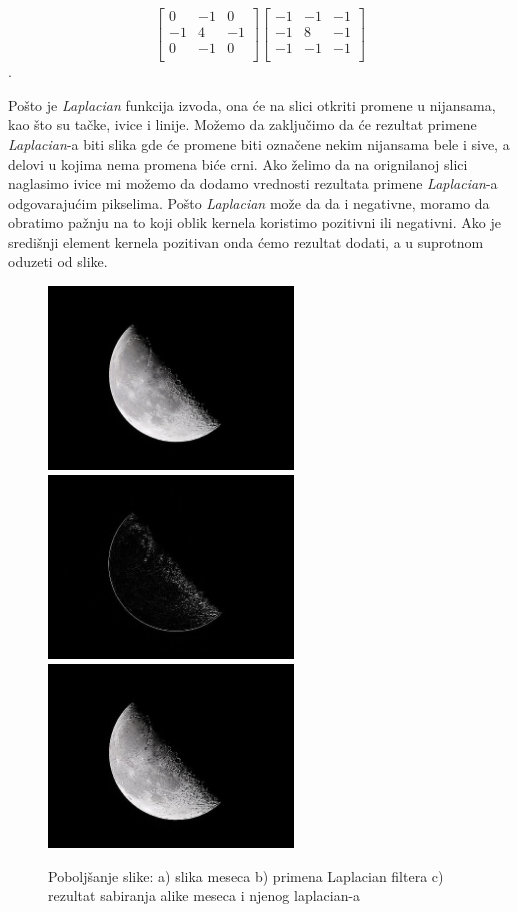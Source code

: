 \documentclass[a4paper,12pt,titlepage]{article}
\begin{document}
\[
\begin{bmatrix}
     0 & -1 & 0 \\
     -1 & 4 & -1 \\
     0 & -1 & 0 \\
\end{bmatrix}
\begin{bmatrix}
     -1 & -1 & -1 \\
     -1 & 8 & -1 \\
     -1 & -1 & -1 \\
\end{bmatrix}
\]. 

Pošto je \emph{Laplacian} funkcija izvoda, ona će na slici otkriti promene u nijansama, kao što su tačke, ivice i linije. Možemo da zaključimo da će rezultat primene \emph{Laplacian}-a biti slika gde će promene biti označene nekim nijansama bele i sive, a delovi u kojima nema promena biće crni. Ako želimo da na orignilanoj slici naglasimo ivice mi možemo da dodamo vrednosti rezultata primene \emph{Laplacian}-a odgovarajućim pikselima. Pošto \emph{Laplacian} može da da i negativne, moramo da obratimo pažnju na to koji oblik kernela koristimo pozitivni ili negativni. Ako je središnji element kernela pozitivan onda ćemo rezultat dodati, a u suprotnom oduzeti od slike.

\begin{figure}[ht!]
\centering
\includegraphics[width=65mm]{img/moon.jpg}
\includegraphics[width=65mm]{img/moonLap.jpg}
\includegraphics[width=65mm]{img/moonEn.jpg}
\caption{Poboljšanje slike: a) slika meseca b) primena Laplacian filtera c) rezultat sabiranja alike meseca i njenog laplacian-a}
\label{overflow}
\end{figure}
\end{document}
